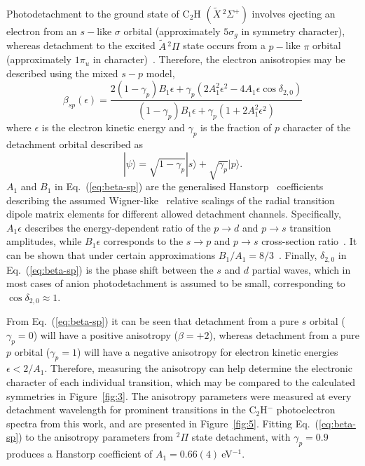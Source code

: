 \documentclass[journal=jpcafh,manuscript=article,layout=onecolumn, 12pt]{achemso}
\begin{document}
Photodetachment to the ground state of C$_2$H $(\tilde{X}\,^2\Sigma^+)$ involves ejecting an electron from an $s-$like $\sigma$ orbital (approximately $5\sigma_g$ in symmetry character), whereas detachment to the excited $\tilde{A}\,^2\Pi$ state occurs from a $p-$like $\pi$ orbital (approximately $1\pi_u$ in character)~\cite{gul21}. Therefore, the electron anisotropies may be described using the mixed $s-p$ model\cite{khu14},
\begin{equation}
\beta_{sp}(\epsilon) = \frac{2(1-\gamma_p)B_1\epsilon + \gamma_p(2A_1^2\epsilon^2-4A_1\epsilon\cos\delta_{2,0})}
{(1-\gamma_p)B_1\epsilon+\gamma_p(1+2A_1^2\epsilon^2)}
\label{eq:beta-sp}
\end{equation}
where $\epsilon$ is the electron kinetic energy and $\gamma_p$ is the fraction of $p$ character of the detachment orbital described as
\begin{equation}
|\psi\rangle = \sqrt{1-\gamma_p}|s\rangle + \sqrt{\gamma_p}|p\rangle.
\end{equation}
$A_1$ and $B_1$ in Eq.~(\ref{eq:beta-sp}) are the generalised Hanstorp~\cite{han89} coefficients describing the assumed Wigner-like~\cite{wig48} relative scalings of the radial transition dipole matrix elements for different allowed detachment channels. Specifically, $A_1\epsilon$ describes the energy-dependent ratio of the $p\rightarrow d$ and $p\rightarrow s$ transition amplitudes, while $B_1\epsilon$ corresponds to the $s\rightarrow p$ and $p\rightarrow s$ cross-section ratio~\cite{khu14}. It can be shown that under certain approximations $B_1/A_1 = 8/3$~\cite{san13}. Finally, $\delta_{2,0}$ in Eq.~(\ref{eq:beta-sp}) is the phase shift between the $s$ and $d$ partial waves, which in most cases of anion photodetachment is assumed to be small, corresponding to $\cos\delta_{2,0}\approx1$.

From Eq.~(\ref{eq:beta-sp}) it can be seen that detachment from a pure $s$ orbital ($\gamma_p=0$) will have a positive anisotropy ($\beta = +2$), whereas detachment from a pure $p$ orbital ($\gamma_p=1$) will have a negative anisotropy for electron kinetic energies $\epsilon < 2/A_1$. Therefore, measuring the anisotropy can help determine the electronic character of each individual transition, which may be compared to the calculated symmetries in Figure~\ref{fig:3}. The anisotropy parameters were measured at every detachment wavelength for prominent transitions in the C$_2$H$^-$ photoelectron spectra from this work, and are presented in Figure~\ref{fig:5}. Fitting Eq.~(\ref{eq:beta-sp}) to the anisotropy parameters from $^2\Pi$ state detachment, with $\gamma_p = 0.9$ produces a Hanstorp coefficient of $A_1=0.66(4)~$eV$^{-1}$.
\end{document}
